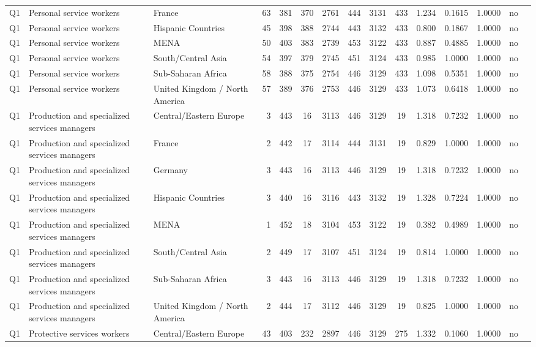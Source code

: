 \begin{longtable}{lllrcccccccccll}
Q1 & Personal service workers & France & 63 & 381 & 370 & 2761 & 444 & 3131 & 433 & 1.234 & 0.1615 & 1.0000 & no \\
Q1 & Personal service workers & Hispanic Countries & 45 & 398 & 388 & 2744 & 443 & 3132 & 433 & 0.800 & 0.1867 & 1.0000 & no \\
Q1 & Personal service workers & MENA & 50 & 403 & 383 & 2739 & 453 & 3122 & 433 & 0.887 & 0.4885 & 1.0000 & no \\
Q1 & Personal service workers & South/Central Asia & 54 & 397 & 379 & 2745 & 451 & 3124 & 433 & 0.985 & 1.0000 & 1.0000 & no \\
Q1 & Personal service workers & Sub-Saharan Africa & 58 & 388 & 375 & 2754 & 446 & 3129 & 433 & 1.098 & 0.5351 & 1.0000 & no \\
Q1 & Personal service workers & United Kingdom / North America & 57 & 389 & 376 & 2753 & 446 & 3129 & 433 & 1.073 & 0.6418 & 1.0000 & no \\
Q1 & Production and specialized services managers & Central/Eastern Europe & 3 & 443 & 16 & 3113 & 446 & 3129 & 19 & 1.318 & 0.7232 & 1.0000 & no \\
Q1 & Production and specialized services managers & France & 2 & 442 & 17 & 3114 & 444 & 3131 & 19 & 0.829 & 1.0000 & 1.0000 & no \\
Q1 & Production and specialized services managers & Germany & 3 & 443 & 16 & 3113 & 446 & 3129 & 19 & 1.318 & 0.7232 & 1.0000 & no \\
Q1 & Production and specialized services managers & Hispanic Countries & 3 & 440 & 16 & 3116 & 443 & 3132 & 19 & 1.328 & 0.7224 & 1.0000 & no \\
Q1 & Production and specialized services managers & MENA & 1 & 452 & 18 & 3104 & 453 & 3122 & 19 & 0.382 & 0.4989 & 1.0000 & no \\
Q1 & Production and specialized services managers & South/Central Asia & 2 & 449 & 17 & 3107 & 451 & 3124 & 19 & 0.814 & 1.0000 & 1.0000 & no \\
Q1 & Production and specialized services managers & Sub-Saharan Africa & 3 & 443 & 16 & 3113 & 446 & 3129 & 19 & 1.318 & 0.7232 & 1.0000 & no \\
Q1 & Production and specialized services managers & United Kingdom / North America & 2 & 444 & 17 & 3112 & 446 & 3129 & 19 & 0.825 & 1.0000 & 1.0000 & no \\
Q1 & Protective services workers & Central/Eastern Europe & 43 & 403 & 232 & 2897 & 446 & 3129 & 275 & 1.332 & 0.1060 & 1.0000 & no \\

\end{longtable}
